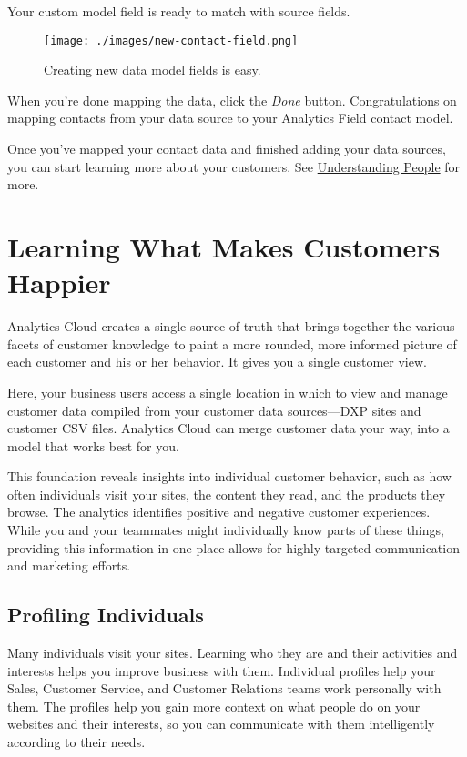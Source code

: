 Your custom model field is ready to match with source fields.

\begin{figure}
\centering
\texttt{[image: ./images/new-contact-field.png]}
\caption{Creating new data model fields is easy.}
\end{figure}

When you're done mapping the data, click the \emph{Done} button.
Congratulations on mapping contacts from your data source to your
Analytics Field contact model.

Once you've mapped your contact data and finished adding your data
sources, you can start learning more about your customers. See
\href{https://github.com/liferay/liferay-docs/blob/7.1.x/discover/analytics-cloud/articles/03-understanding-people/00-understanding-people-intro.markdown}{Understanding
People} for more.

\chapter{Learning What Makes Customers
Happier}\label{learning-what-makes-customers-happier}

Analytics Cloud creates a single source of truth that brings together
the various facets of customer knowledge to paint a more rounded, more
informed picture of each customer and his or her behavior. It gives you
a single customer view.

Here, your business users access a single location in which to view and
manage customer data compiled from your customer data sources---DXP
sites and customer CSV files. Analytics Cloud can merge customer data
your way, into a model that works best for you.

This foundation reveals insights into individual customer behavior, such
as how often individuals visit your sites, the content they read, and
the products they browse. The analytics identifies positive and negative
customer experiences. While you and your teammates might individually
know parts of these things, providing this information in one place
allows for highly targeted communication and marketing efforts.

\section{Profiling Individuals}\label{profiling-individuals}

Many individuals visit your sites. Learning who they are and their
activities and interests helps you improve business with them.
Individual profiles help your Sales, Customer Service, and Customer
Relations teams work personally with them. The profiles help you gain
more context on what people do on your websites and their interests, so
you can communicate with them intelligently according to their needs.

